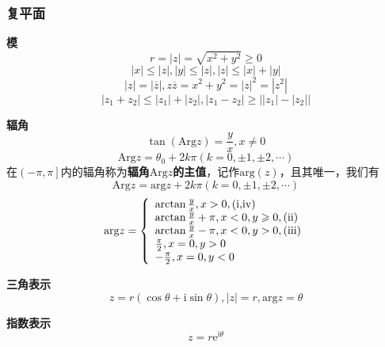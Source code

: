 \documentclass[12pt, a4paper, twoside]{ctexbook}
\begin{document}
\subsubsection*{复平面}

\textbf{模}
$$
r=\left| z \right|=\sqrt{x^2+y^2}\geqslant 0
$$
$$
\left| x \right|\leqslant \left| z \right|,\left| y \right|\leqslant \left| z \right|,\left| z \right|\leqslant \left| x \right|+\left| y \right|
$$
$$
\left| z \right|=\left| \overline{z} \right|,z\overline{z}=x^2+y^2=\left| z \right|^2=\left| z^2 \right|
$$
$$
\left| z_1+z_2 \right|\leqslant \left| z_1 \right|+\left| z_2 \right|,\left| z_1-z_2 \right|\geqslant \left| \left| z_1 \right|-\left| z_2 \right| \right|
$$

\textbf{辐角}
$$
\tan \left(\mathrm{Arg}z\right)=\frac{y}{x},x\ne 0
$$
$$
\mathrm{Arg}z=\theta_0+2k\pi\left(k=0,\pm 1,\pm 2,\cdots\right)
$$
在$\left(-\pi,\pi\right]$内的辐角称为\textbf{辐角$\mathrm{Arg}z$的主值}，记作$\mathrm{arg}\left(z\right)$，且其唯一，我们有
$$
\mathrm{Arg}z=\mathrm{arg}z+2k\pi\left(k=0,\pm 1,\pm 2,\cdots\right)
$$
$$
\text{arg}z=\left\{ \begin{array}{l}
	\arctan \frac{y}{x},x>0,\left(\text{\uppercase\expandafter{\romannumeral1},\uppercase\expandafter{\romannumeral4}}\right)\\
	\arctan \frac{y}{x}+\pi ,x<0,y\geqslant 0,\left(\text{\uppercase\expandafter{\romannumeral2}}\right)\\
	\arctan \frac{y}{x}-\pi ,x<0,y>0,\left(\text{\uppercase\expandafter{\romannumeral3}}\right)\\
	\frac{\pi}{2},x=0,y>0\\
	-\frac{\pi}{2},x=0,y<0\\
\end{array} \right. 
$$

\textbf{三角表示}
$$
z=r\left(\cos \theta + \mathrm{i} \sin \theta \right),\left| z \right|=r,\mathrm{arg}z=\theta
$$

\textbf{指数表示}
$$
z=r\mathrm{e}^{\mathrm{i}\theta}
$$
\end{document}
